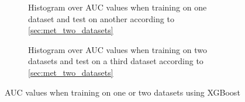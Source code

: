 {{{{{{{\begin{figure}
    \begin{subfigure}[b]{0.5\textwidth}
        \caption{Histogram over AUC values when training on one dataset and test on another according to \autoref{sec:met_two_datasets}}
        \label{fig:auc_single_xgb}
    \end{subfigure}
    \begin{subfigure}[b]{0.5\textwidth}
        \caption{Histogram over AUC values when training on two datasets and test on a third dataset according to \autoref{sec:met_two_datasets}}
        \label{fig:auc_double_xgb}
    \end{subfigure}
    \caption{AUC values when training on one or two datasets using XGBoost}
    \label{fig:auc_hist_tripple_xgb}
\end{figure}

}}}}}}}

